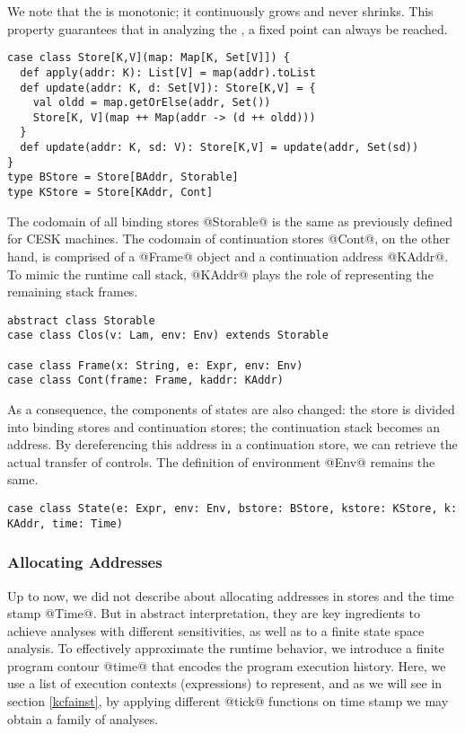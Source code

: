 \documentclass[acmsmall,review,anonymous]{acmart}\settopmatter{printfolios=true,printccs=false,printacmref=false}
\begin{document}
We note that the  is monotonic; it continuously grows and never shrinks. This property
guarantees that in analyzing the , a fixed point can always be reached.

\begin{lstlisting}
case class Store[K,V](map: Map[K, Set[V]]) {
  def apply(addr: K): List[V] = map(addr).toList
  def update(addr: K, d: Set[V]): Store[K,V] = {
    val oldd = map.getOrElse(addr, Set())
    Store[K, V](map ++ Map(addr -> (d ++ oldd)))
  }
  def update(addr: K, sd: V): Store[K,V] = update(addr, Set(sd))
}
type BStore = Store[BAddr, Storable]
type KStore = Store[KAddr, Cont]
\end{lstlisting}

The codomain of all binding stores @Storable@ is the same
as previously defined for CESK machines.
The codomain of continuation stores @Cont@, on the other hand, is comprised of
a @Frame@ object and a continuation address @KAddr@.
To mimic the runtime call stack, @KAddr@ plays the role of
representing the remaining stack frames.

\begin{lstlisting}
abstract class Storable
case class Clos(v: Lam, env: Env) extends Storable

case class Frame(x: String, e: Expr, env: Env)
case class Cont(frame: Frame, kaddr: KAddr)
\end{lstlisting}

As a consequence, the components of states are also changed:
the store is divided into binding stores and continuation stores;
the continuation stack becomes an address.
By dereferencing this address in a continuation store, we can retrieve the
actual transfer of controls. The definition of environment @Env@
remains the same.

\begin{lstlisting}
case class State(e: Expr, env: Env, bstore: BStore, kstore: KStore, k: KAddr, time: Time)
\end{lstlisting}

\subsubsection{Allocating Addresses}
Up to now, we did not describe about allocating addresses in stores and the time stamp @Time@.
But in abstract interpretation, they are key ingredients to achieve
analyses with different sensitivities, as well as to a finite state space analysis\cite{Gilray:2016:ACP:2951913.2951936}.
To effectively approximate the runtime behavior, we introduce a finite
program contour @time@ that encodes the program execution history.
Here, we use a list of execution contexts (expressions) to represent, and
as we will see in section \ref{kcfainst}, by applying different @tick@
functions on time stamp we may obtain a family of analyses.
\end{document}
